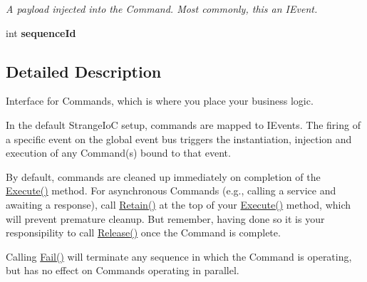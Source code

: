 \begin{DoxyCompactItemize}
\begin{DoxyCompactList}\small\item\em A payload injected into the Command. Most commonly, this an I\-Event. \end{DoxyCompactList}\item 
\hypertarget{interfacestrange_1_1extensions_1_1command_1_1api_1_1_i_command_aaf31811d9547a0c45cc143f5ca828dbe}{int {\bfseries sequence\-Id}}\label{interfacestrange_1_1extensions_1_1command_1_1api_1_1_i_command_aaf31811d9547a0c45cc143f5ca828dbe}

\end{DoxyCompactItemize}


\subsection{Detailed Description}
Interface for Commands, which is where you place your business logic. 

In the default Strange\-Io\-C setup, commands are mapped to I\-Events. The firing of a specific event on the global event bus triggers the instantiation, injection and execution of any Command(s) bound to that event.

By default, commands are cleaned up immediately on completion of the {\ttfamily \hyperlink{interfacestrange_1_1extensions_1_1command_1_1api_1_1_i_command_a49ddf3bbaf19624534fa99fa4725feca}{Execute()}} method. For asynchronous Commands (e.\-g., calling a service and awaiting a response), call {\ttfamily \hyperlink{interfacestrange_1_1extensions_1_1command_1_1api_1_1_i_command_ae24532aa617e2bee62a3798b59b78458}{Retain()}} at the top of your {\ttfamily \hyperlink{interfacestrange_1_1extensions_1_1command_1_1api_1_1_i_command_a49ddf3bbaf19624534fa99fa4725feca}{Execute()}} method, which will prevent premature cleanup. But remember, having done so it is your responsipility to call {\ttfamily \hyperlink{interfacestrange_1_1extensions_1_1command_1_1api_1_1_i_command_a462054fd8e17e6139f9739e32d4d6ced}{Release()}} once the Command is complete.

Calling {\ttfamily \hyperlink{interfacestrange_1_1extensions_1_1command_1_1api_1_1_i_command_a1ad585b6fcc3e4dad5823100a62d9053}{Fail()}} will terminate any sequence in which the Command is operating, but has no effect on Commands operating in parallel. 

